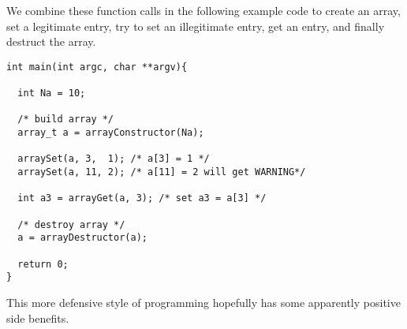 We combine these function calls in the following example code to create an array, set a legitimate entry, try to set an illegitimate entry, get an entry, and finally destruct the array.

\begin{verbatim}
int main(int argc, char **argv){

  int Na = 10;

  /* build array */
  array_t a = arrayConstructor(Na);

  arraySet(a, 3,  1); /* a[3] = 1 */
  arraySet(a, 11, 2); /* a[11] = 2 will get WARNING*/

  int a3 = arrayGet(a, 3); /* set a3 = a[3] */

  /* destroy array */
  a = arrayDestructor(a);

  return 0;
}
\end{verbatim}

This more defensive style of programming hopefully has some apparently positive side benefits. 

